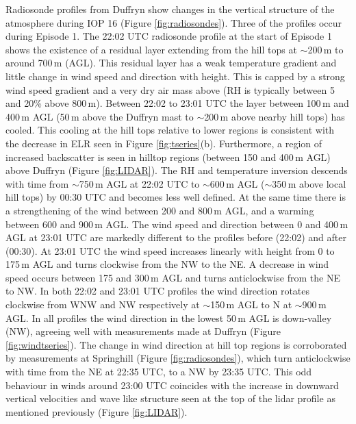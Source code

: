 \documentclass[times]{qjrms4}
\begin{document}
Radiosonde profiles from Duffryn show changes in the vertical structure of the atmosphere during IOP 16 (Figure \ref{fig:radiosondes}). Three of the profiles occur during Episode 1. The 22:02 UTC radiosonde profile at the start of Episode 1 shows the existence of a residual layer extending from the hill tops at $\sim$200$\,\mbox{m}$ to around 700$\,\mbox{m}$ (AGL). This residual layer has a weak temperature gradient and little change in wind speed and direction with height. This is capped by a strong wind speed gradient and a very dry air mass above (RH is typically between 5 and 20\% above 800$\,\mbox{m}$). Between 22:02 to 23:01 UTC the layer between 100$\,\mbox{m}$ and 400$\,\mbox{m}$ AGL (50$\,\mbox{m}$ above the Duffryn mast to $\sim$200$\,\mbox{m}$ above nearby hill tops) has cooled. This cooling at the hill tops relative to lower regions is consistent with the decrease in ELR seen in Figure \ref{fig:tseries}(b). Furthermore, a region of increased backscatter is seen in hilltop regions (between 150 and 400$\,\mbox{m}$ AGL) above Duffryn (Figure \ref{fig:LIDAR}). The RH and temperature inversion descends with time from $\sim$750$\,\mbox{m}$ AGL at 22:02 UTC to $\sim$600$\,\mbox{m}$ AGL ($\sim$350$\,\mbox{m}$ above local hill tops) by 00:30 UTC and becomes less well defined. At the same time there is a strengthening of the wind between 200 and 800$\,\mbox{m}$ AGL, and a warming between 600 and 900$\,\mbox{m}$ AGL. The wind speed and direction between 0 and 400$\,\mbox{m}$ AGL at 23:01 UTC are markedly different to the profiles before (22:02) and after (00:30). At 23:01 UTC the wind speed increases linearly with height from 0 to 175$\,\mbox{m}$ AGL and turns clockwise from the NW to the NE. A decrease in wind speed occurs between 175 and 300$\,\mbox{m}$ AGL and turns anticlockwise from the NE to NW. In both 22:02 and 23:01 UTC profiles the wind direction rotates clockwise from WNW and NW respectively at $\sim$150$\,\mbox{m}$ AGL to N at $\sim$900$\,\mbox{m}$ AGL. In all profiles the wind direction in the lowest 50$\,\mbox{m}$ AGL is down-valley (NW), agreeing well with measurements made at Duffryn (Figure \ref{fig:windtseries}). The change in wind direction at hill top regions is corroborated by measurements at Springhill (Figure \ref{fig:radiosondes}), which turn anticlockwise with time from the NE at 22:35 UTC, to a NW by 23:35 UTC. This odd behaviour in winds around 23:00 UTC coincides with the increase in downward vertical velocities and wave like structure seen at the top of the lidar profile as mentioned previously (Figure \ref{fig:LIDAR}).
\end{document}
